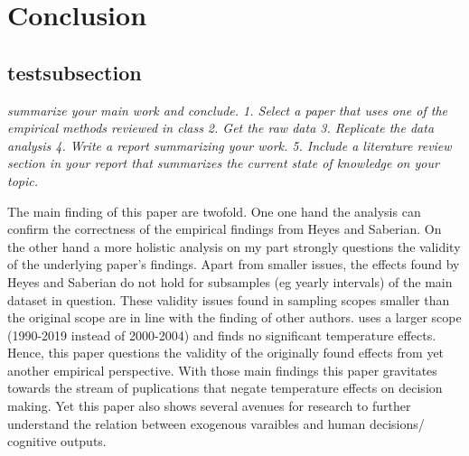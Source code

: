 \documentclass[11pt]{article}
\begin{document}
	\section{ Conclusion}
	\subsection{testsubsection}
	\textit{	summarize your main work and conclude.
		1. Select a paper that uses one of the empirical methods reviewed in class
		2. Get the raw data
		3. Replicate the data analysis
		4. Write a report summarizing your work.
		5. Include a literature review section in your report that summarizes the current state
		of knowledge on your topic.
	}
	
	The main finding of this paper are twofold. One one hand the analysis can confirm the correctness of the empirical findings from Heyes and Saberian. On the other hand a more holistic analysis on my part strongly questions the validity of the underlying paper's findings. Apart from smaller issues, the effects found by Heyes and Saberian do not hold for subsamples (eg yearly intervals) of the main dataset in question. These validity issues found in sampling scopes smaller than the original scope are in line with the finding of other authors. \cite{Spamann.2020} uses a larger scope (1990-2019 instead of 2000-2004) and finds no significant temperature effects. Hence, this paper questions the validity of the originally found effects from yet another empirical perspective.
	With those main findings this paper gravitates towards the stream of puplications that negate temperature effects on decision making. Yet this paper also shows several avenues for research to further understand the relation between exogenous varaibles and human decisions/ cognitive outputs.
	
	\newpage
	
\end{document}
